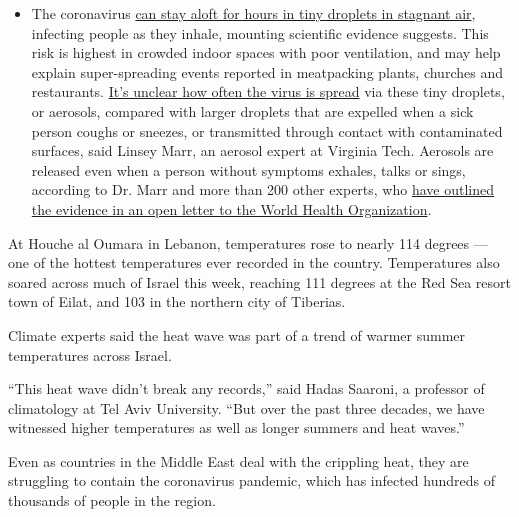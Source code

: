 \begin{itemize}
  \begin{itemize}
  \tightlist
  \item
    The coronavirus
    \href{https://www.nytimes3xbfgragh.onion/2020/07/04/health/239-experts-with-one-big-claim-the-coronavirus-is-airborne.html?action=click\&pgtype=Article\&state=default\&region=MAIN_CONTENT_3\&context=storylines_faq}{can
    stay aloft for hours in tiny droplets in stagnant air}, infecting
    people as they inhale, mounting scientific evidence suggests. This
    risk is highest in crowded indoor spaces with poor ventilation, and
    may help explain super-spreading events reported in meatpacking
    plants, churches and restaurants.
    \href{https://www.nytimes3xbfgragh.onion/2020/07/06/health/coronavirus-airborne-aerosols.html?action=click\&pgtype=Article\&state=default\&region=MAIN_CONTENT_3\&context=storylines_faq}{It's
    unclear how often the virus is spread} via these tiny droplets, or
    aerosols, compared with larger droplets that are expelled when a
    sick person coughs or sneezes, or transmitted through contact with
    contaminated surfaces, said Linsey Marr, an aerosol expert at
    Virginia Tech. Aerosols are released even when a person without
    symptoms exhales, talks or sings, according to Dr. Marr and more
    than 200 other experts, who
    \href{https://academic.oup.com/cid/article/doi/10.1093/cid/ciaa939/5867798}{have
    outlined the evidence in an open letter to the World Health
    Organization}.
  \end{itemize}
\end{itemize}

At Houche al Oumara in Lebanon, temperatures rose to nearly 114 degrees
--- one of the hottest temperatures ever recorded in the country.
Temperatures also soared across much of Israel this week, reaching 111
degrees at the Red Sea resort town of Eilat, and 103 in the northern
city of Tiberias.

Climate experts said the heat wave was part of a trend of warmer summer
temperatures across Israel.

``This heat wave didn't break any records,'' said Hadas Saaroni, a
professor of climatology at Tel Aviv University. ``But over the past
three decades, we have witnessed higher temperatures as well as longer
summers and heat waves.''

Even as countries in the Middle East deal with the crippling heat, they
are struggling to contain the coronavirus pandemic, which has infected
hundreds of thousands of people in the region.

